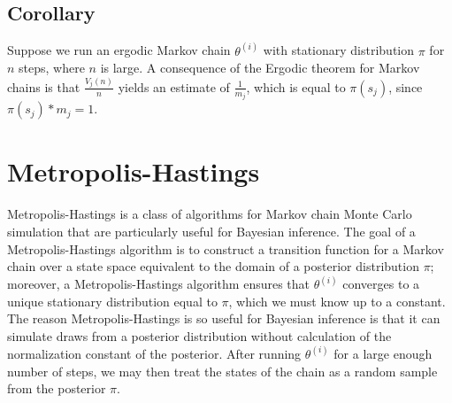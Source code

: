 \documentclass[12pt,twoside]{reedthesis}
\begin{document}
		\subsection*{Corollary}
		Suppose we run an ergodic Markov chain $\theta^{(i)}$ with stationary distribution $\pi$ for $n$ steps, where $n$ is large. A consequence of the Ergodic theorem for Markov chains is that $\frac{V_j(n)}{n}$ yields an estimate of $\frac{1}{m_j}$, which is equal to $\pi(s_j)$, since $\pi(s_j) * m_j = 1$.
	\section{Metropolis-Hastings}
			Metropolis-Hastings is a class of algorithms for Markov chain Monte Carlo simulation that are particularly useful for Bayesian inference. 
			The goal of a Metropolis-Hastings algorithm is to construct a transition function for a Markov chain over a state space equivalent to the domain of a posterior distribution $\pi$; moreover, a Metropolis-Hastings algorithm ensures that $\theta^{(i)}$ converges to a unique stationary distribution equal to $\pi$, which we must know up to a constant. 
			The reason Metropolis-Hastings is so useful for Bayesian inference is that it can simulate draws from a posterior distribution without calculation of the normalization constant of the posterior. After running $\theta^{(i)}$ for a large enough number of steps, we may then treat the states of the chain as a random sample from the posterior $\pi$.
			
			
\end{document}
